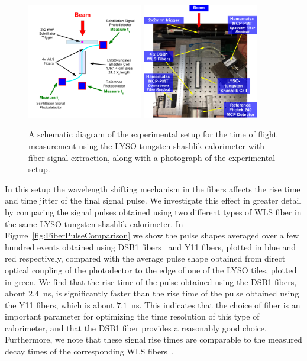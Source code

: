 \documentclass[12pt]{article}
\begin{document}
\begin{figure}[H] \centering
\includegraphics[width=0.45\textwidth]{figs/ShashlikFiberSetupSchematic} 
\includegraphics[width=0.45\textwidth]{figs/ShashlikFiberSetupPhoto} 
\caption{ A schematic diagram of the experimental setup for the
time of flight measurement using the LYSO-tungsten shashlik calorimeter
with fiber signal extraction, along with a photograph of the
experimental setup. } 
\label{fig:ShashlikFiberSetup}
\end{figure}

In this setup the wavelength shifting mechanism in the fibers 
affects the rise time and time jitter of the final signal 
pulse. We investigate this effect in greater detail by
comparing the signal pulses obtained using two different types
of WLS fiber in the same LYSO-tungsten shashlik
calorimeter. In Figure~\ref{fig:FiberPulseComparison} we show
the pulse shapes averaged over a few hundred events obtained 
using DSB1 fibers~\cite{Albrecht} and Y11 fibers, plotted in blue and red respectively,
compared with the average pulse shape obtained from direct optical 
coupling of the photodector to the edge of one of the LYSO tiles, plotted in green.
We find that the rise time of the pulse obtained using the 
DSB1 fibers, about $2.4$~ns, is significantly faster than the rise time
of the pulse obtained using the Y11 fibers, which is about $7.1$~ns. 
This indicates that the choice of fiber is an important parameter for 
optimizing the time resolution of this type of calorimeter, 
and that the DSB1 fiber provides a reasonably good choice. Furthermore,
we note that these signal rise times are comparable to the measured 
decay times of the corresponding WLS fibers~\cite{Albrecht}.
\end{document}
